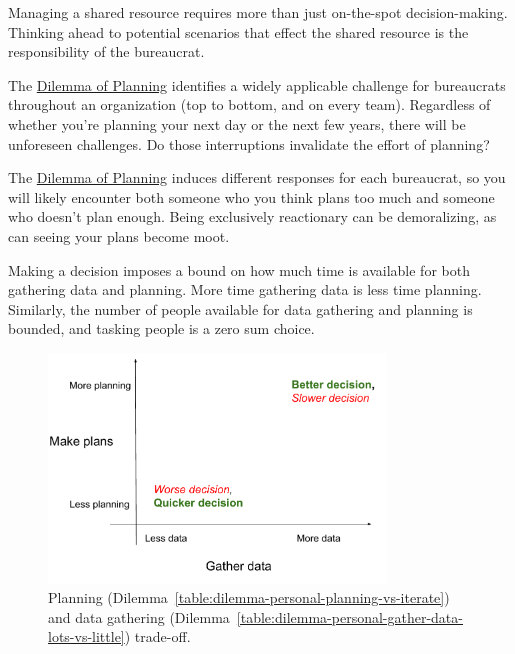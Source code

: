 Managing a shared resource requires more than just on-the-spot decision-making. Thinking ahead to potential scenarios that effect the shared resource is the responsibility of the bureaucrat. 

The \hyperref[table:dilemma-personal-planning-vs-iterate]{Dilemma of Planning} identifies a widely applicable challenge for bureaucrats throughout an organization (top to bottom, and on every team). Regardless of whether you're planning your next day or the next few years, there will be unforeseen challenges. Do those interruptions invalidate the effort of planning?

The \hyperref[table:dilemma-personal-planning-vs-iterate]{Dilemma of Planning} induces different responses for each bureaucrat, so you will likely encounter both someone who you think plans too much and someone who doesn't plan enough. Being exclusively reactionary can be demoralizing, as can seeing your plans become moot.




Making a decision imposes a bound on how much time is available for both gathering data and planning. More time gathering data is less time planning. Similarly, the number of people available for data gathering and planning is bounded, and tasking people is a zero sum choice.

\begin{figure}[H] %
    \centering
    \includegraphics[width=0.8\textwidth]{images/planning_and_data_gathering.pdf}
    \caption{Planning (Dilemma~\ref{table:dilemma-personal-planning-vs-iterate}) and data gathering (Dilemma~\ref{table:dilemma-personal-gather-data-lots-vs-little}) trade-off.}
    \label{fig:pareto_frontier}
\end{figure}

